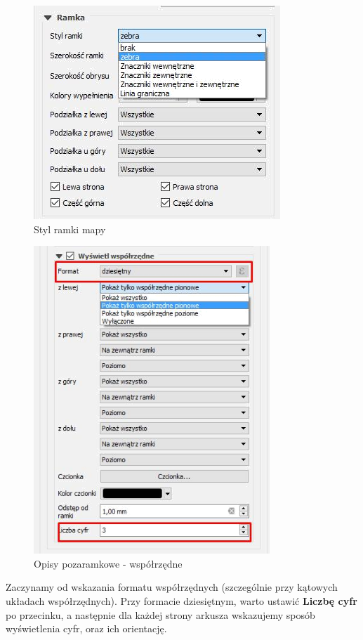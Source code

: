 \documentclass[12pt,a4paper]{book}
\begin{document}
\begin{center}
\begin{figure}
\includegraphics[width=9.289cm,height=8.043cm]{008-styl-ramki.png}
\caption{Styl ramki mapy}
\end{figure}
\end{center}


\begin{center}
\begin{figure}
\includegraphics[width=8.901cm,height=11.592cm]{008-pozaramkowe.png}
\caption{Opisy pozaramkowe - współrzędne}
\end{figure}
\end{center}
Zaczynamy od wskazania formatu współrzędnych (szczególnie przy kątowych układach współrzędnych). Przy formacie dziesiętnym, warto ustawić \textbf{Liczbę cyfr }po przecinku,\textbf{ }a następnie dla każdej strony arkusza wskazujemy sposób wyświetlenia cyfr, oraz ich orientację.
\end{document}
